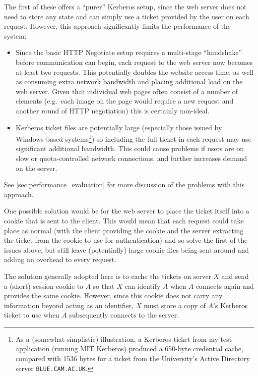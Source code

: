 \documentclass[12pt]{report}
\begin{document}
The first of these offers a ``purer'' Kerberos setup, since the web server does not need to store any state and can simply use a ticket provided by the user on each request. However, this approach significantly limits the performance of the system:
\begin{itemize}
\item
  Since the basic HTTP Negotiate setup requires a multi-stage ``handshake'' before communication can begin, each request to the web server now becomes at least two requests. This potentially doubles the website access time, as well as consuming extra network bandwidth and placing additional load on the web server. Given that individual web pages often consist of a number of elements (e.g.\ each image on the page would require a new request and another round of HTTP negotiation) this is certainly non-ideal.
\item
  Kerberos ticket files are potentially large (especially those issued by Windows-based systems\footnote{As a (somewhat simplistic) illustration, a Kerberos ticket from my test application (running MIT Kerberos) produced a 650-byte credential cache, compared with 1536 bytes for a ticket from the University's Active Directory server \texttt{BLUE.CAM.AC.UK}.}) so including the full ticket in each request may use significant additional bandwidth. This could cause problems if users are on slow or quota-controlled network connections, and further increases demand on the server.
\end{itemize}

See \autoref{sec:performance_evaluation} for more discussion of the problems with this approach.

One possible solution would be for the web server to place the ticket itself into a cookie that is sent to the client. This would mean that each request could take place as normal (with the client providing the cookie and the server extracting the ticket from the cookie to use for authentication) and so solve the first of the issues above, but still leave (potentially) large cookie files being sent around and adding an overhead to every request.

The solution generally adopted here is to cache the tickets on server $X$ and send a (short) session cookie to $A$ so that $X$ can identify $A$ when $A$ connects again and provides the same cookie. However, since this cookie does not carry any information beyond acting as an identifier, $X$ must store a copy of $A$'s Kerberos ticket to use when $A$ subsequently connects to the server.
\end{document}
